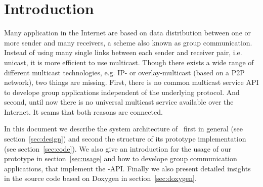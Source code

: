 \section{Introduction}

Many application in the Internet are based on data distribution between
one or more sender and many receivers, a scheme also known as group
communication. Instead of using many single links between each sender and
receiver pair, i.e. unicast, it is more efficient to use multicast.
Though there exists a wide range of different multicast technologies,
e.g. IP- or overlay-multicast (based on a P2P network), two things are
missing. First, there is no common multicast service API to develope
group applications independent of the underlying protocol. And second,
until now there is no universal multicast service available over the
Internet. It seams that both reasons are connected.

In this document we describe the system architecture of \hamcast\, first
in general (see section~\ref{sec:design}) and second the structure of its
prototype implementation (see section~\ref{sec:code}). We also give an
introduction for the usage of our prototype in section~\ref{sec:usage}
and how to develope group communication applications, that implement the
\hamcast-API. Finally we also present detailed insights in the source code
based on Doxygen in section~\ref{sec:doxygen}.
